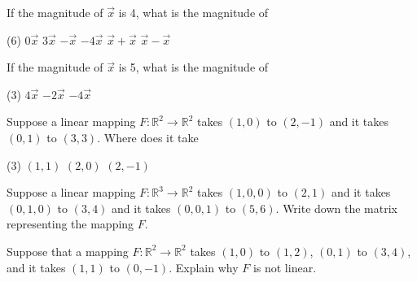 \documentclass{ximera}
\begin{document}


\begin{exercise}
    If the magnitude of $\vec{x}$ is 4, what is the magnitude of
    \begin{tasks}(6)
        \task $0\vec{x}$
        \task $3\vec{x}$
        \task $-\vec{x}$
        \task $-4\vec{x}$
        \task $\vec{x}+\vec{x}$
        \task $\vec{x}-\vec{x}$
    \end{tasks}
\end{exercise}

\begin{exercise}%
    If the magnitude of $\vec{x}$ is 5, what is the magnitude of
    \begin{tasks}(3)
        \task $4\vec{x}$
        \task $-2\vec{x}$
        \task $-4\vec{x}$
    \end{tasks}
\end{exercise}

\begin{exercise}
    Suppose a linear mapping $F \colon {\mathbb R}^2 \to {\mathbb R}^2$ takes $(1,0)$ to $(2,-1)$ and it takes $(0,1)$ to $(3,3)$.  Where does it take
    \begin{tasks}(3)
        \task $(1,1)$
        \task $(2,0)$
        \task $(2,-1)$
    \end{tasks}
\end{exercise}

\begin{exercise}
    Suppose a linear mapping $F \colon {\mathbb R}^3 \to {\mathbb R}^2$ takes $(1,0,0)$ to $(2,1)$ and it takes $(0,1,0)$ to $(3,4)$ and it takes $(0,0,1)$ to $(5,6)$.  Write down the matrix representing the mapping $F$.
\end{exercise}

\begin{exercise}
    Suppose that a mapping $F \colon {\mathbb R}^2 \to \mathbb{R}^2$ takes $(1,0)$ to $(1,2)$, $(0,1)$ to $(3,4)$, and it takes $(1,1)$ to $(0,-1)$. Explain why $F$ is not linear.
\end{exercise}
\end{document}
